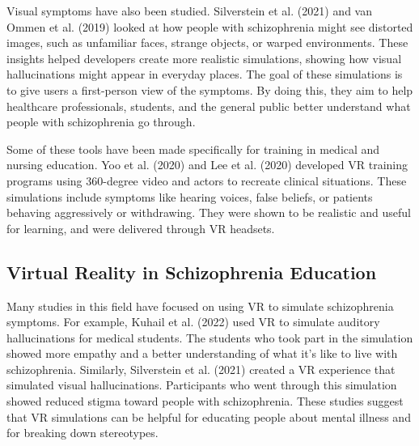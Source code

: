 Visual symptoms have also been studied. Silverstein et al. (2021) \cite{Silverstein2021} and van Ommen et al. (2019) \cite{Vanommen2019} looked at how people with schizophrenia might see distorted images, such as unfamiliar faces, strange objects, or warped environments. These insights helped developers create more realistic simulations, showing how visual hallucinations might appear in everyday places. The goal of these simulations is to give users a first-person view of the symptoms. By doing this, they aim to help healthcare professionals, students, and the general public better understand what people with schizophrenia go through.

Some of these tools have been made specifically for training in medical and nursing education. Yoo et al. (2020) \cite{Yoo2020} and Lee et al. (2020) \cite{Lee2020} developed VR training programs using 360-degree video and actors to recreate clinical situations. These simulations include symptoms like hearing voices, false beliefs, or patients behaving aggressively or withdrawing. They were shown to be realistic and useful for learning, and were delivered through VR headsets.

\subsection{Virtual Reality in Schizophrenia Education}

Many studies in this field have focused on using VR to simulate schizophrenia symptoms. For example, Kuhail et al. (2022) \cite{Kuhail2022} used VR to simulate auditory hallucinations for medical students. The students who took part in the simulation showed more empathy and a better understanding of what it’s like to live with schizophrenia. Similarly, Silverstein et al. (2021) \cite{Silverstein2021} created a VR experience that simulated visual hallucinations. Participants who went through this simulation showed reduced stigma toward people with schizophrenia. These studies suggest that VR simulations can be helpful for educating people about mental illness and for breaking down stereotypes.

